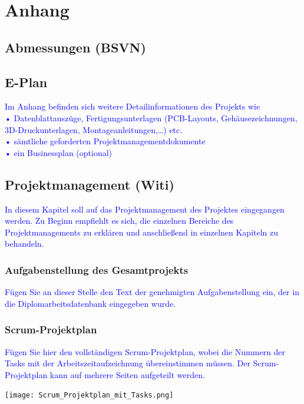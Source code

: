 \section{Anhang}

\subsection{Abmessungen (BSVN)}

\subsection{E-Plan}

\textcolor{blue}{Im Anhang befinden sich weitere Detailinformationen des Projekts wie\\
•	Datenblattauszüge, Fertigungsunterlagen (PCB-Layouts, Gehäusezeichnungen, 3D-Druckunterlagen, Montageanleitungen,…) etc.\\
•	sämtliche geforderten Projektmanagementdokumente\\
•	ein Businessplan (optional)
}

\subsection{Projektmanagement (Witi)}
\textcolor{blue}{In diesem Kapitel soll auf das Projektmanagement des Projektes eingegangen werden. Zu Beginn empfiehlt es sich, die einzelnen Bereiche des Projektmanagements zu erklären und anschließend in einzelnen Kapiteln zu behandeln.}

\subsubsection{Aufgabenstellung des Gesamtprojekts}
\textcolor{blue}{Fügen Sie an dieser Stelle den Text der genehmigten Aufgabenstellung ein, der in die Diplomarbeitsdatenbank  eingegeben wurde.}

\subsubsection{Scrum-Projektplan}
\textcolor{blue}{Fügen Sie hier den vollständigen Scrum-Projektplan, wobei die Nummern der Tasks mit der Arbeitszeitaufzeichnung übereinstimmen müssen. Der Scrum-Projektplan kann auf mehrere Seiten aufgeteilt werden.}

\bgroup
    \centering
    \texttt{[image: Scrum\_Projektplan\_mit\_Tasks.png]}
\egroup

